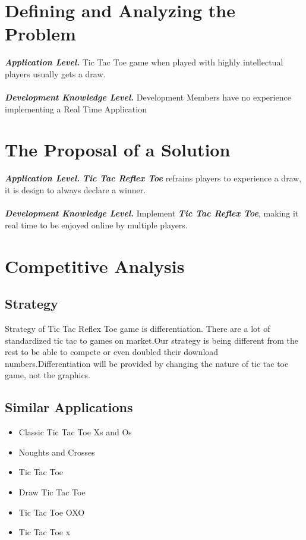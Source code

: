 \documentclass{article}
\begin{document}
\section{Defining and Analyzing the Problem}
    \textbf{\emph{Application Level.}} Tic Tac Toe game when played with highly intellectual players usually gets a draw.  
    \\\\
    \textbf{\emph{Development Knowledge Level.}} Development Members have no experience implementing a Real Time Application
    ~\\

\section{The Proposal of a Solution}
    \textbf{\emph{Application Level.}}  \textbf{\emph{Tic Tac Reflex Toe}} refrains players to experience a draw, it is design to always declare a winner.\\\\
    \textbf{\emph{Development Knowledge Level.}}  Implement \textbf{\emph{Tic Tac Reflex Toe}}, making it real time to be enjoyed online by multiple players.
    ~\\
    \newpage

\section{Competitive Analysis}
    \subsection{Strategy}
    Strategy of Tic Tac Reflex Toe game is differentiation. There are a lot of standardized tic tac to games on market.Our strategy is being different from  the rest to be able to compete or even doubled their download numbers.Differentiation will be provided by changing the nature of tic tac toe game, not the graphics.
    \subsection{Similar Applications}
    \begin{itemize}
        	\item Classic Tic Tac Toe Xs and Os
        	\item Noughts and Crosses
        	\item Tic Tac Toe
        	\item Draw Tic Tac Toe
        	\item Tic Tac Toe OXO
        	\item Tic Tac Toe x
        \end{itemize}
    
\end{document}
